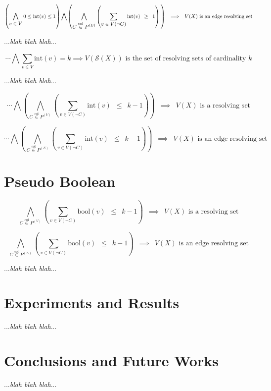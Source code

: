 \documentclass{article}
\newcommand{\combine}[7]{#1 #2 \vphantom{#6} #3 #4 #5 #6 \vphantom{#2} #7}
\begin{document}
\[ \combine{\left(}{\bigwedge \limits_{\displaystyle v \in V} 0 \leq \mathrm{int}(v) \leq 1}{\right)}{\bigwedge}{\left(}{\bigwedge \limits_{\displaystyle C \overset{\mathrm{col}}{\in} P^{(E)}} \left( \sum \limits_{\displaystyle v \in V(\neg C)} \mathrm{int}(v)\enspace \geq\enspace 1 \right)}{\right)}\enspace \implies\enspace V(X) \text{ is an edge resolving set} \]

...\textit{blah blah blah}...

\[ \cdots \bigwedge \sum \limits_{\displaystyle v \in V} \mathrm{int}(v) = k \implies V(\mathcal{S}(X)) \text{ is the set of resolving sets of cardinality } k \]

...\textit{blah blah blah}...

\[ \cdots \bigwedge \left( \bigwedge \limits_{\displaystyle C \overset{\mathrm{col}}{\in} P^{(V)}} \left( \sum \limits_{\displaystyle v \in V(\neg C)} \mathrm{int}(v)\enspace \leq\enspace k - 1 \right) \right)\enspace \implies\enspace V(X) \text{ is a resolving set} \]

\[ \cdots \bigwedge \left( \bigwedge \limits_{\displaystyle C \overset{\mathrm{col}}{\in} P^{(E)}} \left( \sum \limits_{\displaystyle v \in V(\neg C)} \mathrm{int}(v)\enspace \leq\enspace k - 1 \right) \right)\enspace \implies\enspace V(X) \text{ is an edge resolving set} \]

\clearpage
\section{Pseudo Boolean}

\[ \bigwedge \limits_{\displaystyle C \overset{\mathrm{col}}{\in} P^{(V)}} \left( \sum \limits_{\displaystyle v \in V(\neg C)} \mathrm{bool}(v)\enspace \leq\enspace k - 1 \right)\enspace \implies\enspace V(X) \text{ is a resolving set} \]

\[ \bigwedge \limits_{\displaystyle C \overset{\mathrm{col}}{\in} P^{(E)}} \left( \sum \limits_{\displaystyle v \in V(\neg C)} \mathrm{bool}(v)\enspace \leq\enspace k - 1 \right)\enspace \implies\enspace V(X) \text{ is an edge resolving set} \]

...\textit{blah blah blah}...

\clearpage
\section{Experiments and Results}

...\textit{blah blah blah}...

\section{Conclusions and Future Works}

...\textit{blah blah blah}...
\end{document}
